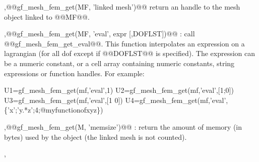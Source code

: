 \begin{cmddescription}
    \sep{@@gf_mesh_fem_get(MF, 'linked mesh')@@} return an handle to the mesh object
  linked to @@MF@@.

  \sep{@@gf_mesh_fem_get(MF, 'eval', expr [,DOFLST])@@} : call @@gf_mesh_fem_get_eval@@. This function interpolates an expression on a lagrangian \tmf (for all dof except if @@DOFLST@@ is specified). The expression can be a numeric constant, or a cell array containing numeric constants, string expressions or function handles. For example:
  \begin{mcode}
U1=gf_mesh_fem_get(mf,'eval',1)
U2=gf_mesh_fem_get(mf,'eval',[1;0]) %
U3=gf_mesh_fem_get(mf,'eval',[1 0]) %
U4=gf_mesh_fem_get(mf,'eval',\{'x';'y.*z';4;@myfunctionofxyz\})
  \end{mcode}

  \sep{@@gf_mesh_fem_get(M, 'memsize')@@} : return the amount of
  memory (in bytes) used by the \tmf object (the linked mesh is not
  counted).
\end{cmddescription}
\begin{gfseealso}
  , 
\end{gfseealso}
\newpage


